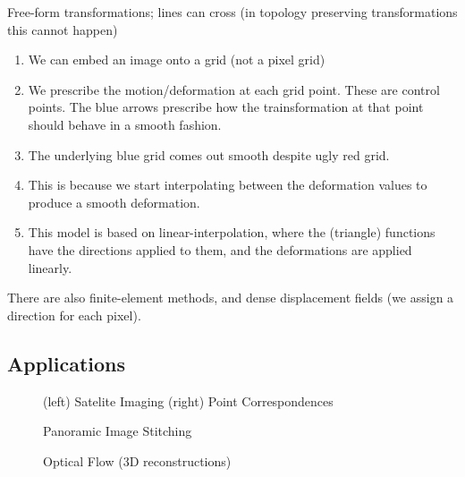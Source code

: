 \documentclass[11pt]{article}
\begin{document}
Free-form transformations; lines can cross (in topology preserving transformations this cannot happen)

\begin{figure}[H]
    \centering
\end{figure}

\begin{enumerate}
    \item We can embed an image onto a grid (not a pixel grid)
    \item We prescribe the motion/deformation at each grid point. These are control points. The blue arrows prescribe how the trainsformation at that point should behave in a smooth fashion.
    \item The underlying blue grid comes out smooth despite ugly red grid.
    \item This is because we start interpolating between the deformation values to produce a smooth deformation.
    \item This model is based on linear-interpolation, where the (triangle) functions have the directions applied to them, and the deformations are applied linearly.
\end{enumerate}

There are also finite-element methods, and dense displacement fields (we assign a direction for each pixel).

\subsection{Applications}

\begin{figure}[H]
    \centering
    \caption*{(left) Satelite Imaging (right) Point Correspondences}
\end{figure}

\begin{figure}[H]
    \centering
    \caption*{Panoramic Image Stitching}
\end{figure}

\begin{figure}[H]
    \centering
    \caption*{Optical Flow (3D reconstructions)}
\end{figure}
\end{document}
